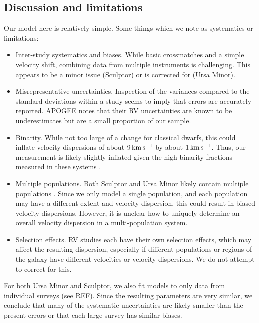 \subsection{Discussion and
limitations}\label{discussion-and-limitations}

Our model here is relatively simple. Some things which we note as
systematics or limitations:

\begin{itemize}
\tightlist
\item
  Inter-study systematics and biases. While basic crossmatches and a
  simple velocity shift, combining data from multiple instruments is
  challenging. This appears to be a minor issue (Sculptor) or is
  corrected for (Ursa Minor).
\item
  Misrepresentative uncertainties. Inspection of the variances compared
  to the standard deviations within a study seems to imply that errors
  are accurately reported. APOGEE notes that their RV uncertainties are
  known to be underestimates but are a small proportion of our sample.
\item
  Binarity. While not too large of a change for classical dwarfs, this
  could inflate velocity dispersions of about \(9\,{\rm km\,s^{-1}}\) by about
  \(1\,{\rm km\,s^{-1}}\)\citep{spencer+2017}. Thus, our measurement is likely
  slightly inflated given the high binarity fractions measured in these
  systems \citep[\citet{spencer+2018}]{arroyo-polonio+2023}.
\item
  Multiple populations. Both Sculptor and Ursa Minor likely contain
  multiple populations \citep[\citet{pace+2020},
  \citet{tolstoy+2004}]{arroyo-polonio+2024}. Since we only model a
  single population, and each population may have a different extent and
  velocity dispersion, this could result in biased velocity dispersions.
  However, it is unclear how to uniquely determine an overall velocity
  dispersion in a multi-population system.
\item
  Selection effects. RV studies each have their own selection effects,
  which may affect the resulting dispersion, especially if different
  populations or regions of the galaxy have different velocities or
  velocity dispersions. We do not attempt to correct for this.
\end{itemize}

For both Ursa Minor and Sculptor, we also fit models to only data from
individual surveys (see REF). Since the resulting parameters are very
similar, we conclude that many of the systematic uncertainties are
likely smaller than the present errors or that each large survey has
similar biases.

